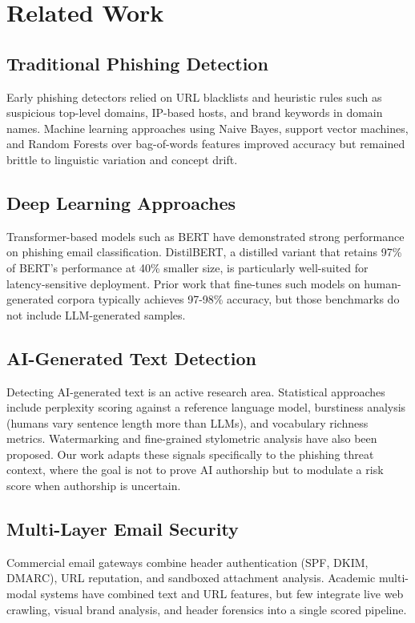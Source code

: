 \documentclass[pdflatex,sn-mathphys-num]{sn-jnl}
\begin{document}
\section{Related Work}\label{sec:related_work}

\subsection{Traditional Phishing Detection}
Early phishing detectors relied on URL blacklists and heuristic rules such as suspicious top-level domains, IP-based hosts, and brand keywords in domain names. Machine learning approaches using Naive Bayes, support vector machines, and Random Forests over bag-of-words features improved accuracy but remained brittle to linguistic variation and concept drift.

\subsection{Deep Learning Approaches}
Transformer-based models such as BERT have demonstrated strong performance on phishing email classification. DistilBERT, a distilled variant that retains 97\% of BERT's performance at 40\% smaller size, is particularly well-suited for latency-sensitive deployment. Prior work that fine-tunes such models on human-generated corpora typically achieves 97-98\% accuracy, but those benchmarks do not include LLM-generated samples.

\subsection{AI-Generated Text Detection}
Detecting AI-generated text is an active research area. Statistical approaches include perplexity scoring against a reference language model, burstiness analysis (humans vary sentence length more than LLMs), and vocabulary richness metrics. Watermarking and fine-grained stylometric analysis have also been proposed. Our work adapts these signals specifically to the phishing threat context, where the goal is not to prove AI authorship but to modulate a risk score when authorship is uncertain.

\subsection{Multi-Layer Email Security}
Commercial email gateways combine header authentication (SPF, DKIM, DMARC), URL reputation, and sandboxed attachment analysis. Academic multi-modal systems have combined text and URL features, but few integrate live web crawling, visual brand analysis, and header forensics into a single scored pipeline.
\end{document}

